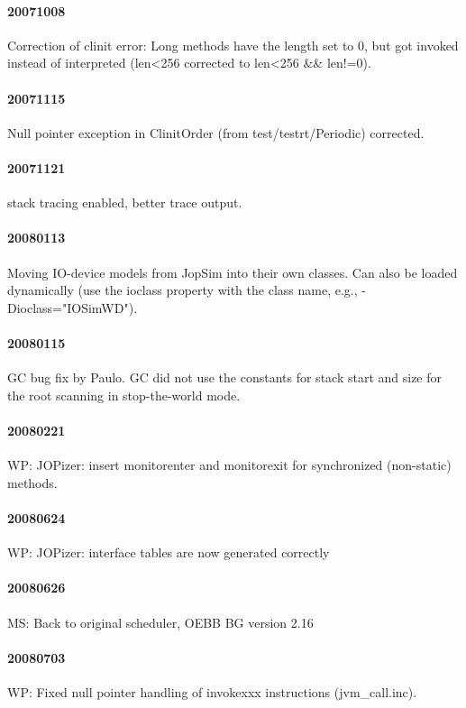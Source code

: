 \documentclass[a4paper,12pt]{scrartcl}
\newcommand{\code}[1]{{\textsf{#1}}}
\begin{document}
\paragraph{20071008} Correction of clinit error: Long methods have
the length set to 0, but got invoked instead of interpreted (len<256
corrected to len<256 \&\& len!=0).

\paragraph{20071115} Null pointer exception in ClinitOrder
(from test/testrt/Periodic) corrected.

\paragraph{20071121} stack tracing enabled, better trace output.

\paragraph{20080113} Moving IO-device models from JopSim into their
own classes. Can also be loaded dynamically (use the \code{ioclass}
property with the class name, e.g., \code{-Dioclass="IOSimWD"}).

\paragraph{20080115} GC bug fix by Paulo. GC did not use the
constants for stack start and size for the root scanning in
stop-the-world mode.

\paragraph{20080221} WP: JOPizer: insert monitorenter and monitorexit for
synchronized (non-static) methods.

\paragraph{20080624} WP: JOPizer: interface tables are now generated correctly

\paragraph{20080626} MS: Back to original scheduler, OEBB BG version
2.16

\paragraph{20080703} WP: Fixed null pointer handling of invokexxx
instructions (\code{jvm\_call.inc}).
\end{document}
